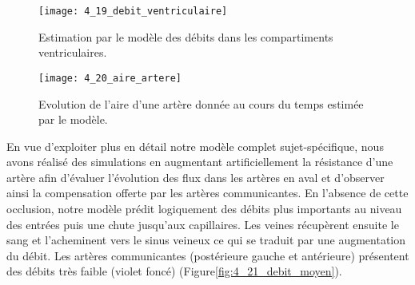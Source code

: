 \begin{figure}[!t]
\centering
\texttt{[image: 4\_19\_debit\_ventriculaire]}
\caption{Estimation par le modèle des débits dans les compartiments ventriculaires.}
\label{fig:4_19_debit_ventriculaire}	
\end{figure}
\begin{figure}[!t]
\centering
\texttt{[image: 4\_20\_aire\_artere]}
\caption{Evolution de l'aire d'une artère donnée au cours du temps estimée par le modèle.}
\label{fig:4_20_aire_artere}	
\end{figure}
En vue d’exploiter plus en détail notre modèle complet sujet-spécifique, nous avons réalisé des
simulations en augmentant artificiellement la résistance d’une artère afin d’évaluer l’évolution des flux
dans les artères en aval et d’observer ainsi la compensation offerte par les artères communicantes. En
l’absence de cette occlusion, notre modèle prédit logiquement des débits plus importants au niveau
des entrées puis une chute jusqu’aux capillaires. Les veines récupèrent ensuite le sang et l’acheminent
vers le sinus veineux ce qui se traduit par une augmentation du débit. Les artères communicantes
(postérieure gauche et antérieure) présentent des débits très faible (violet foncé) (Figure\ref{fig:4_21_debit_moyen}).


